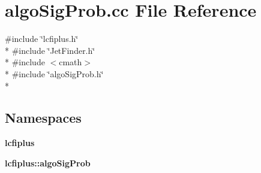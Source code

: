 \section{algo\-Sig\-Prob.\-cc File Reference}
\label{algoSigProb_8cc}
{\ttfamily \#include \char`\"{}lcfiplus.\-h\char`\"{}}\\*
{\ttfamily \#include \char`\"{}Jet\-Finder.\-h\char`\"{}}\\*
{\ttfamily \#include $<$cmath$>$}\\*
{\ttfamily \#include \char`\"{}algo\-Sig\-Prob.\-h\char`\"{}}\\*
\subsection*{Namespaces}
\begin{DoxyCompactItemize}
\item 
{\bf lcfiplus}
\item 
{\bf lcfiplus\-::algo\-Sig\-Prob}
\end{DoxyCompactItemize}
